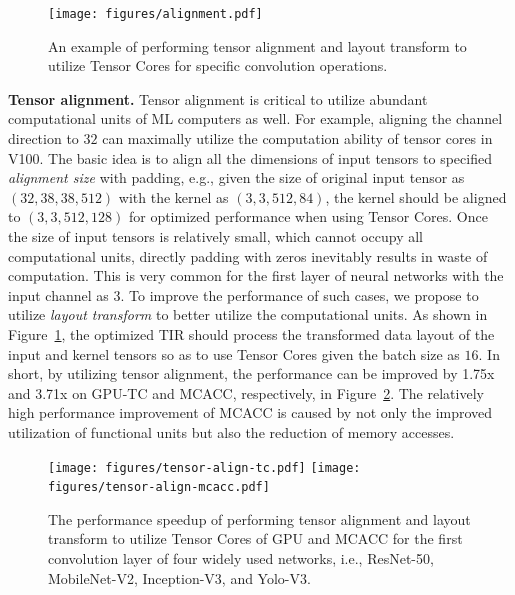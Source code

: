 
\begin{figure}[t]
  \begin{center}
\texttt{[image: figures/alignment.pdf]}
\end{center}
\vspace{-15pt}
\caption{\footnotesize An example of performing tensor alignment and layout transform to utilize Tensor Cores for specific convolution operations.}
\label{fig:alignment}
\vspace{-15pt}
\end{figure}

\textbf{Tensor alignment.} Tensor alignment is critical to utilize abundant computational units of ML computers as well. For example, aligning the channel direction to $32$ can maximally utilize the computation ability of tensor cores in V100. The basic idea is to align all the dimensions of input tensors to specified \emph{alignment size} with padding, e.g., given the size of original input tensor as $(32,38,38,512)$ with the kernel as $(3,3,512,84)$, the kernel should be aligned to $(3,3,512,128)$ for optimized performance when using Tensor Cores. Once the size of input tensors is relatively small, which cannot occupy all computational units, directly padding with zeros inevitably results in waste of computation. This is very common for the first layer of neural networks with the input channel as $3$. To improve the performance of such cases, we propose to utilize \emph{layout transform} to better utilize the computational units. As shown in Figure~\ref{fig:alignment}, the optimized TIR should process the transformed data layout of the input and kernel tensors so as to use Tensor Cores given the batch size as $16$. In short, by utilizing tensor alignment, the performance can be improved by 1.75x and 3.71x on GPU-TC and MCACC, respectively, in Figure~\ref{fig:align-exp}. The relatively high performance improvement of MCACC is caused by not only the improved utilization of functional units but also the reduction of memory accesses.


\begin{figure}
  \begin{center}
\texttt{[image: figures/tensor-align-tc.pdf]}
\texttt{[image: figures/tensor-align-mcacc.pdf]}
\end{center}
\vspace{-15pt}
\caption{\footnotesize The performance speedup of performing tensor alignment and layout transform to utilize Tensor Cores of GPU and MCACC for the first convolution layer of four widely used networks, i.e., ResNet-50, MobileNet-V2, Inception-V3, and Yolo-V3.}
\label{fig:align-exp}
\vspace{-10pt}
\end{figure}

